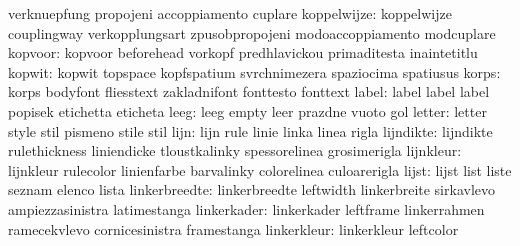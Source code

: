                           verknuepfung              propojeni
                           accoppiamento             cuplare
              koppelwijze: koppelwijze               couplingway
                           verkopplungsart           zpusobpropojeni
                           modoaccoppiamento         modcuplare
                  kopvoor: kopvoor                   beforehead
                           vorkopf                   predhlavickou
                           primaditesta              inaintetitlu
                   kopwit: kopwit                    topspace
                           kopfspatium               svrchnimezera
                           spaziocima                spatiusus
                    korps: korps                     bodyfont
                           fliesstext                zakladnifont
                           fonttesto                 fonttext
                    label: label                     label
                           label                     popisek
                           etichetta                 eticheta
                     leeg: leeg                      empty
                           leer                      prazdne
                           vuoto                     gol
                   letter: letter                    style
                           stil                      pismeno
                           stile                     stil
                     lijn: lijn                      rule
                           linie                     linka
                           linea                     rigla
                lijndikte: lijndikte                 rulethickness
                           liniendicke               tloustkalinky
                           spessorelinea             grosimerigla
                lijnkleur: lijnkleur                 rulecolor
                           linienfarbe               barvalinky
                           colorelinea               culoarerigla
                    lijst: lijst                     list
                           liste                     seznam
                           elenco                    lista
            linkerbreedte: linkerbreedte             leftwidth
                           linkerbreite              sirkavlevo
                           ampiezzasinistra          latimestanga
              linkerkader: linkerkader               leftframe
                           linkerrahmen              ramecekvlevo
                           cornicesinistra           framestanga
              linkerkleur: linkerkleur               leftcolor
